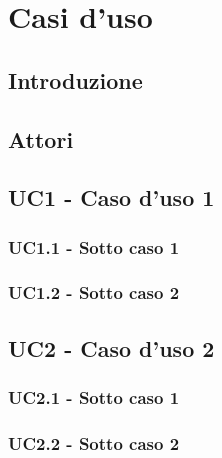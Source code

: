 \section{Casi d'uso}
\subsection{Introduzione}
\subsection{Attori}
\subsection{UC1 - Caso d'uso 1}
\subsubsection{UC1.1 - Sotto caso 1}
\subsubsection{UC1.2 - Sotto caso 2}
\subsection{UC2 - Caso d'uso 2}
\subsubsection{UC2.1 - Sotto caso 1}
\subsubsection{UC2.2 - Sotto caso 2}
